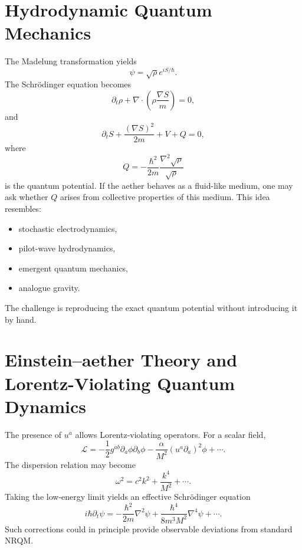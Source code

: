 \documentclass[11pt]{article}
\begin{document}
\section{Hydrodynamic Quantum Mechanics}
The Madelung transformation yields
\begin{equation}
\psi=\sqrt{\rho}e^{iS/\hbar}.
\end{equation}
The Schr\"odinger equation becomes
\begin{equation}
\partial_t\rho
+
\nabla\cdot
\left(
\rho \frac{\nabla S}{m}
\right)
=
0,
\end{equation}
and
\begin{equation}
\partial_t S
+
\frac{(\nabla S)^2}{2m}
+
V
+
Q
=
0,
\end{equation}
where
\begin{equation}
Q
=
-\frac{\hbar^2}{2m}
\frac{\nabla^2\sqrt{\rho}}
{\sqrt{\rho}}
\end{equation}
is the quantum potential.
If the aether behaves as a fluid-like medium, one may ask whether
$Q$ arises from collective properties of this medium.
This idea resembles:
\begin{itemize}
\item stochastic electrodynamics,
\item pilot-wave hydrodynamics,
\item emergent quantum mechanics,
\item analogue gravity.
\end{itemize}
The challenge is reproducing the exact quantum potential without
introducing it by hand.
\section{Einstein--aether Theory and Lorentz-Violating Quantum Dynamics}
The presence of $u^a$ allows Lorentz-violating operators.
For a scalar field,
\begin{equation}
\mathcal L
=
-\frac12
g^{ab}
\partial_a\phi
\partial_b\phi
-\frac{\alpha}{M^2}
(u^a\partial_a)^2\phi
+\cdots .
\end{equation}
The dispersion relation may become
\begin{equation}
\omega^2
=
c^2k^2
+
\frac{k^4}{M^2}
+\cdots .
\end{equation}
Taking the low-energy limit yields an effective Schr\"odinger equation
\begin{equation}
i\hbar \partial_t\psi
=
-\frac{\hbar^2}{2m}
\nabla^2\psi
+
\frac{\hbar^4}{8m^3M^2}
\nabla^4\psi
+\cdots.
\end{equation}
Such corrections could in principle provide observable deviations from
standard NRQM.
\end{document}
